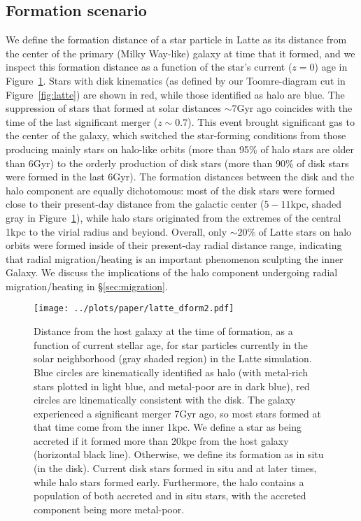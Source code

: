 \documentclass[apj, twocolappendix, numberedappendix, appendixfloats]{emulateapj}
\begin{document}
\subsection{Formation scenario}
We define the formation distance of a star particle in Latte as its distance from the center of the primary (Milky Way-like) galaxy at time that it formed, and we inspect this formation distance as a function of the star's current ($z = 0$) age in Figure~\ref{fig:dform}.
Stars with disk kinematics (as defined by our Toomre-diagram cut in Figure~\ref{fig:latte}) are shown in red, while those identified as halo are blue.
The suppression of stars that formed at solar distances $\sim$7\;Gyr ago coincides with the time of the last significant merger ($z\sim0.7$).
This event brought significant gas to the center of the galaxy, which switched the star-forming conditions from those producing mainly stars on halo-like orbits (more than 95\% of halo stars are older than 6\;Gyr) to the orderly production of disk stars (more than 90\% of disk stars were formed in the last 6\;Gyr).
The formation distances between the disk and the halo component are equally dichotomous: most of the disk stars were formed close to their present-day distance from the galactic center ($5-11$\;kpc, shaded gray in Figure~\ref{fig:dform}), while halo stars originated from the extremes of the central 1\;kpc to the virial radius and beyiond.
Overall, only $\sim20$\% of Latte stars on halo orbits were formed inside of their present-day radial distance range, indicating that radial migration/heating is an important phenomenon sculpting the inner Galaxy.
We discuss the implications of the halo component undergoing radial migration/heating in \S\ref{sec:migration}.

\begin{figure}
\begin{center}
\texttt{[image: ../plots/paper/latte\_dform2.pdf]}
\caption{Distance from the host galaxy at the time of formation, as a function of current stellar age, for star particles currently in the solar neighborhood (gray shaded region) in the Latte simulation.
Blue circles are kinematically identified as halo (with metal-rich stars plotted in light blue, and metal-poor are in dark blue), red circles are kinematically consistent with the disk.
The galaxy experienced a significant merger 7\;Gyr ago, so most stars formed at that time come from the inner 1\;kpc.
We define a star as being accreted if it formed more than 20\;kpc from the host galaxy (horizontal black line).
Otherwise, we define its formation as in situ (in the disk).
Current disk stars formed in situ and at later times, while halo stars formed early.
Furthermore, the halo contains a population of both accreted and in situ stars, with the accreted component being more metal-poor.}
\label{fig:dform}
\end{center}
\end{figure}
\end{document}

